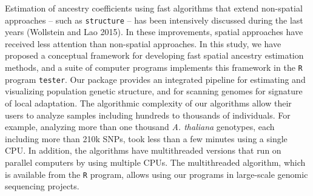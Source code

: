 Estimation of ancestry coefficients using fast algorithms that extend non-spatial approaches -- such as {\tt structure} -- has been intensively discussed during the last years (Wollstein and Lao 2015). In these improvements, spatial approaches have received less attention than non-spatial approaches. In this study, we have proposed a conceptual framework for developing fast spatial ancestry estimation methods, and a suite of computer programs implements this framework in the {\tt R} program {\tt tester}. Our package provides an integrated pipeline for estimating and visualizing population genetic structure,  and for scanning genomes for signature of local adaptation. The algorithmic complexity of our algorithms allow their users to analyze samples including hundreds to thousands of individuals. For example, analyzing more than one thousand {\it A. thaliana} genotypes, each including more than 210k SNPs, took less than a few minutes using a single CPU. In addition, the algorithms have multithreaded versions that run on parallel computers by using multiple CPUs. The multithreaded algorithm, which is available from the {\tt R} program, allows using our programs in large-scale genomic sequencing projects. 

 
 
 



 























